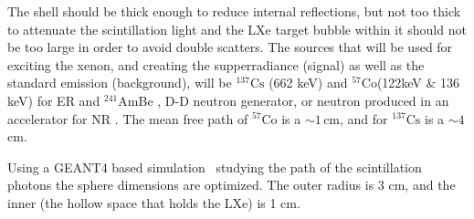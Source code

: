 The shell should be thick enough to reduce internal reflections, but not 
too thick to attenuate the scintillation light and the LXe target bubble within it should not be too large in order to avoid double scatters. 
The sources that will be used for exciting the xenon, and creating the supperradiance 
(signal) as well as the standard emission (background), will be $^{137} \mathrm{Cs}$ 
(662 keV) and $^{57} \mathrm{Co}$(122keV \& 136 keV) for ER and $^{241}$AmBe , 
D-D neutron generator, or neutron produced in an accelerator for NR . The mean 
free path of $^{57} \mathrm{Co}$ is a $\sim 1$\,cm, and for $^{137} \mathrm{Cs}$ is a $\sim4$\,cm.

Using a GEANT4 based simulation~\cite{AGOSTINELLI2003250} studying the path of the scintillation photons the sphere dimensions are optimized. 
The outer radius  is 3 cm, and the inner (the hollow space that holds the LXe) is 1 cm. 
